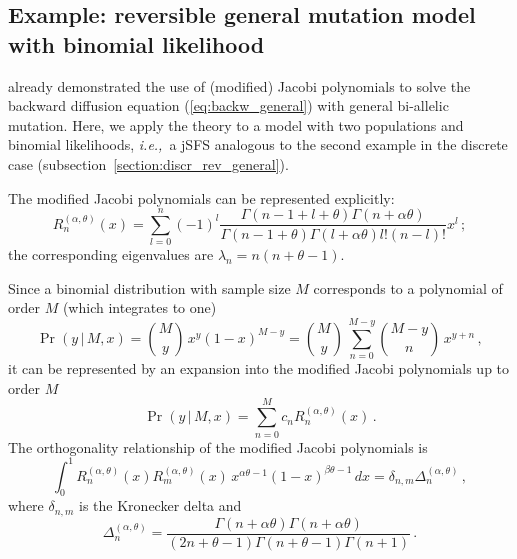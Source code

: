 \documentclass[preprint]{elsarticle}
\newcommand\given{{\,|\,}}
\newcommand\ie{{\it i.e.,}}
\begin{document}
\subsection{Example: reversible general mutation model with binomial likelihood}

\citet{Song12} already demonstrated the use of (modified) Jacobi polynomials to solve the backward diffusion equation (\ref{eq:backw_general}) with general bi-allelic mutation. Here, we apply the theory to a model with two populations and binomial likelihoods, \ie\ a jSFS analogous to the second example in the discrete case (subsection~\ref{section:discr_rev_general}). 

The modified Jacobi polynomials can be represented explicitly:
\begin{equation}
  R_n^{(\alpha,\theta)}(x)=\sum_{l=0}^n(-1)^l\frac{\Gamma(n-1+l+\theta)\Gamma(n+\alpha\theta)}{\Gamma(n-1+\theta)\Gamma(l+\alpha\theta)l!(n-l)!}x^l\,;
\end{equation}
the corresponding eigenvalues are $\lambda_n=n(n+\theta-1)$. 

Since a binomial distribution with sample size $M$ corresponds to a polynomial of order $M$ (which integrates to one) 
\begin{equation}
\Pr(y\given M,x)=\binom{M}{y}\,x^{y}(1-x)^{M-y}
=\binom{M}{y}\,\sum_{n=0}^{M-y} \binom{M-y}{n}\,x^{y+n}\,,
\end{equation}
it can be represented by an expansion into the modified Jacobi polynomials up to order $M$
\begin{equation}
\Pr(y\given M,x)=\sum_{n=0}^M c_n R_n^{(\alpha,\theta)}(x)\,.
\end{equation}
The orthogonality relationship of the modified Jacobi polynomials is
\begin{equation}
    \int_0^1 R_n^{(\alpha,\theta)}(x) R_m^{(\alpha,\theta)}(x)\, x^{\alpha\theta-1}(1-x)^{\beta\theta-1}\,dx=\delta_{n,m} \Delta_n^{(\alpha,\theta)}\,,
\end{equation}
where $\delta_{n,m}$ is the Kronecker delta and 
\begin{equation}
    \Delta_n^{(\alpha,\theta)}=\frac{\Gamma(n+\alpha\theta)\Gamma(n+\alpha\theta)}{(2n+\theta-1)\Gamma(n+\theta-1)\Gamma(n+1)}\,.
\end{equation}
\end{document}
